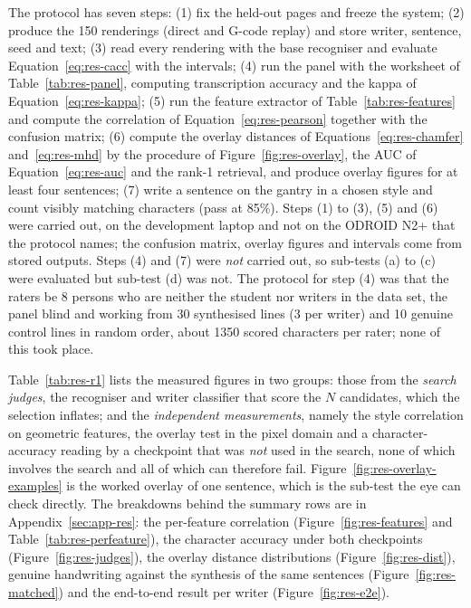 
            The protocol has seven steps: (1) fix the held-out pages and freeze the system; (2) produce the 150 renderings (direct and G-code replay) and store writer, sentence, seed and text; (3) read every rendering with the base recogniser and evaluate Equation~\ref{eq:res-cacc} with the intervals; (4) run the panel with the worksheet of Table~\ref{tab:res-panel}, computing transcription accuracy and the kappa of Equation~\ref{eq:res-kappa}; (5) run the feature extractor of Table~\ref{tab:res-features} and compute the correlation of Equation~\ref{eq:res-pearson} together with the confusion matrix; (6) compute the overlay distances of Equations~\ref{eq:res-chamfer} and~\ref{eq:res-mhd} by the procedure of Figure~\ref{fig:res-overlay}, the AUC of Equation~\ref{eq:res-auc} and the rank-1 retrieval, and produce overlay figures for at least four sentences; (7) write a sentence on the gantry in a chosen style and count visibly matching characters (pass at 85\%).
            Steps (1) to (3), (5) and (6) were carried out, on the development laptop and not on the ODROID N2+ that the protocol names; the confusion matrix, overlay figures and intervals come from stored outputs.
            Steps (4) and (7) were \emph{not} carried out, so sub-tests (a) to (c) were evaluated but sub-test (d) was not.
            The protocol for step (4) was that the raters be 8 persons who are neither the student nor writers in the data set, the panel blind and working from 30 synthesised lines (3 per writer) and 10 genuine control lines in random order, about 1350 scored characters per rater; none of this took place.


            Table~\ref{tab:res-r1} lists the measured figures in two groups: those from the \emph{search judges}, the recogniser and writer classifier that score the $N$ candidates, which the selection inflates; and the \emph{independent measurements}, namely the style correlation on geometric features, the overlay test in the pixel domain and a character-accuracy reading by a checkpoint that was \emph{not} used in the search, none of which involves the search and all of which can therefore fail.
            Figure~\ref{fig:res-overlay-examples} is the worked overlay of one sentence, which is the sub-test the eye can check directly.
            The breakdowns behind the summary rows are in Appendix~\ref{sec:app-res}: the per-feature correlation (Figure~\ref{fig:res-features} and Table~\ref{tab:res-perfeature}), the character accuracy under both checkpoints (Figure~\ref{fig:res-judges}), the overlay distance distributions (Figure~\ref{fig:res-dist}), genuine handwriting against the synthesis of the same sentences (Figure~\ref{fig:res-matched}) and the end-to-end result per writer (Figure~\ref{fig:res-e2e}).


